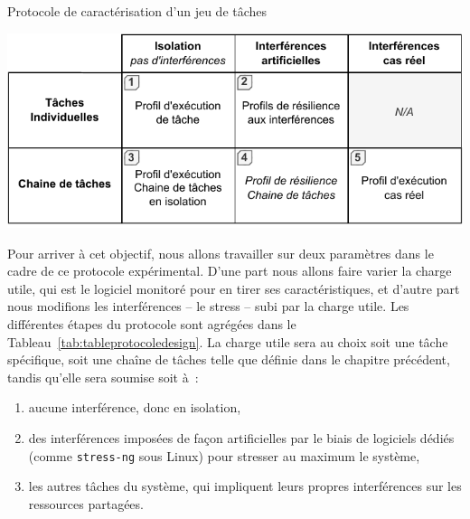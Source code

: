 \documentclass[french, a4paper, 11pt, twoside, pdftex]{StyleThese}
\begin{document}
        \begin{table}[ht]
        	\centering
        	\caption{Protocole de caractérisation d'un jeu de tâches}
        	\label{tab:tableprotocoledesign}
        	\includegraphics[width=0.8\linewidth]{tables/Table_Protocole_Design}
        \end{table}
             
        Pour arriver à cet objectif, nous allons travailler sur deux paramètres dans le cadre de ce protocole expérimental. D'une part nous allons faire varier la charge utile, qui est le logiciel monitoré pour en tirer ses caractéristiques, et d'autre part nous modifions les interférences -- le stress -- subi par la charge utile. Les différentes étapes du protocole sont agrégées dans le Tableau~\ref{tab:tableprotocoledesign}. La charge utile sera au choix soit une tâche spécifique, soit une chaîne de tâches telle que définie dans le chapitre précédent, tandis qu'elle sera soumise soit à~: \begin{enumerate}[label=\bfseries\alph*)] 
        	\item aucune interférence, donc en isolation,
        	\item des interférences imposées de façon artificielles par le biais de logiciels dédiés (comme \texttt{stress-ng} sous Linux) pour stresser au maximum le système,
        	\item les autres tâches du système, qui impliquent leurs propres interférences sur les ressources partagées.
        \end{enumerate}
    
\end{document}
